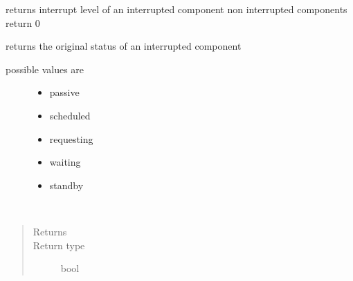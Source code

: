 \documentclass[letterpaper,10pt,english]{sphinxmanual}
\begin{document}
\begin{fulllineitems}
\begin{fulllineitems}
\end{fulllineitems}


\begin{fulllineitems}
\label{\detokenize{Reference:salabim.Component.interrupt_level}}
returns interrupt level of an interrupted component 
non interrupted components return 0

\end{fulllineitems}


\begin{fulllineitems}
\label{\detokenize{Reference:salabim.Component.interrupted_status}}
returns the original status of an interrupted component
\begin{description}
\item[{possible values are}] \leavevmode\begin{itemize}
\item {} 
passive

\item {} 
scheduled

\item {} 
requesting

\item {} 
waiting

\item {} 
standby

\end{itemize}

\end{description}

\end{fulllineitems}


\begin{fulllineitems}
\label{\detokenize{Reference:salabim.Component.iscurrent}}~\begin{quote}\begin{description}
\item[{Returns}] \leavevmode
{}

\item[{Return type}] \leavevmode
bool


\end{description}
\end{quote}
\end{fulllineitems}
\end{fulllineitems}
\end{document}
